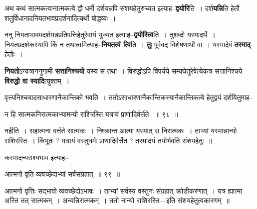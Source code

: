 \documentclass[article,12pt,a4paper]{memoir}
\begin{document}
	  \pstart अथ कथं सात्मकत्वानात्मकत्वे द्वौ धर्मौ दर्शयन्नपि संशयहेतुरुच्यत इत्याह--\textbf{द्वयोरि}ति । दर्श\leavevmode{}\textbf{यन्नि}ति हेतौ शतुर्विधानादनियतभावप्रदर्शनादित्यर्थो बोद्धव्यः ।
	\pend
      

	  \pstart ननु नियताभावमदर्शयन्नप्रतिपत्तिहेतुरेवायं युज्यत इत्याह--\textbf{द्वयोस्त्वि}ति । तुशब्दो यस्मादर्थे । नियतप्रदर्शकस्यापि किं न तथात्वमित्याह--\textbf{नियतत्वं त्वि}ति । \textbf{तुः} पूर्ववद् विशेषणार्थो वा । यस्मादेवं \textbf{तस्माद्} हेतोः ।
	\pend
      

	  \pstart \textbf{नियतो}ऽन्यत्राननुगामी \textbf{सत्तानिश्चयो} यस्य स तथा । विरुद्धोऽपि विपर्यये सम्यघेतुरेवेत्येकत्र सत्तानिश्चये \textbf{विरुद्धो वा स्यादि}त्युक्तम् ।
	\pend
	  \bigskip
	  \begingroup
	

	  \pstart वृत्त्यनिश्चयादसाधारणानैकान्तिको भवति । ततोऽसाधारणानैकान्तिकस्यानैकान्तिकत्वे हेतुद्वयं दर्शयितुमाह--
	\pend
        
	  \bigskip
	  \begingroup
	

	  \pstart न हि सात्मकनिरात्मकाभ्यामन्यो राशिरस्ति यत्रायं प्राणादिर्वर्त्तते  ॥ ९८ ॥
	\pend
      
	  \endgroup
	 

	  \pstart नहीति । सहात्मना वर्त्तते सात्मकः । निष्क्रान्त आत्मा यस्मात् स निरात्मकः । ताभ्यां यस्मान्नान्यो राशिरस्ति । किंभूतः ? यत्रायं वस्तुधर्मः प्राणादिर्वर्त्तेत ? तस्मादयं तयोर्भवति संशयहेतुः ॥
	\pend
        

	  \pstart कस्मादन्यराश्यभाव इत्याह--
	\pend
        
	  \bigskip
	  \begingroup
	

	  \pstart आत्मनो वृति-व्यवच्छेदाभ्यां सर्वसंग्रहात् ॥ ९९ ॥
	\pend
      
	  \endgroup
	 

	  \pstart आत्मनो वृत्तिः सद्भावो व्यवच्छेदोऽभावः । ताभ्यां सर्वस्य वस्तुनः संग्रहात् क्रोडीकरणात् । यत्र ह्यात्मा अस्ति तत् सात्मकम् । अन्यन्निरात्मकम् । ततो नान्यो राशिरस्ति—इति संशयहेतुत्वकारणम् ॥
	\pend
      
\end{document}
